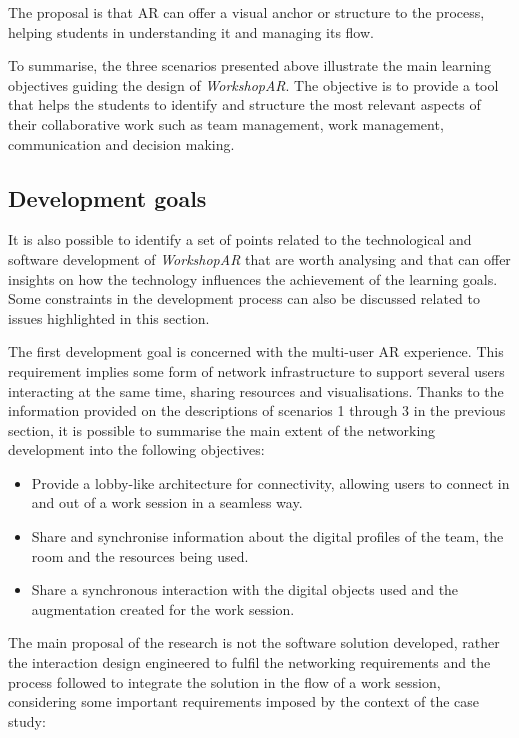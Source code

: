 The proposal is that \ac{AR} can offer a visual anchor or structure to the process, helping students in understanding it and managing its flow.

To summarise, the three scenarios presented above illustrate the main learning objectives guiding the design of \emph{WorkshopAR}. The objective is to provide a tool that
helps the students to identify and structure the most relevant aspects of their collaborative work such as team management, work management, communication and decision
making.

\subsection{Development goals \label{sec:4-1-3}}

It is also possible to identify a set of points related to the technological and software development of \emph{WorkshopAR} that are worth analysing and that can offer
insights on how the technology influences the achievement of the learning goals. Some constraints in the development process can also be discussed related to issues
highlighted in this section.

The first development goal is concerned with the multi-user \ac{AR} experience. This requirement implies some form of network infrastructure to support several users
interacting at the same time, sharing resources and visualisations. Thanks to the information provided on the descriptions of scenarios 1 through 3 in the previous section,
it is possible to summarise the main extent of the networking development into the following objectives:

\begin{itemize}
    \item Provide a lobby-like architecture for connectivity, allowing users to connect in and out of a work session in a seamless way.
    \item Share and synchronise information about the digital profiles of the team, the room and the resources being used.
    \item Share a synchronous interaction with the digital objects used and the augmentation created for the work session.
\end{itemize}

The main proposal of the research is not the software solution developed, rather the interaction design engineered to fulfil the networking requirements and the process
followed to integrate the solution in the flow of a work session, considering some important requirements imposed by the context of the case study:

